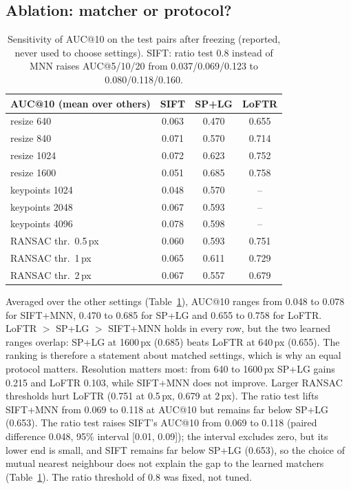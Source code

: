 \documentclass[10pt,twocolumn,letterpaper]{article}
\begin{document}
\subsection{Ablation: matcher or protocol?}
\begin{table}[t]\centering\small
\begin{tabular}{lccc}
\toprule
AUC@10 (mean over others) & SIFT & SP+LG & LoFTR\\
\midrule
resize 640 & 0.063 & 0.470 & 0.655\\
resize 840 & 0.071 & 0.570 & 0.714\\
resize 1024 & 0.072 & 0.623 & 0.752\\
resize 1600 & 0.051 & 0.685 & 0.758\\
keypoints 1024 & 0.048 & 0.570 & --\\
keypoints 2048 & 0.067 & 0.593 & --\\
keypoints 4096 & 0.078 & 0.598 & --\\
RANSAC thr.\ 0.5\,px & 0.060 & 0.593 & 0.751\\
RANSAC thr.\ 1\,px & 0.065 & 0.611 & 0.729\\
RANSAC thr.\ 2\,px & 0.067 & 0.557 & 0.679\\
\bottomrule
\end{tabular}
\caption{Sensitivity of AUC@10 on the test pairs after freezing (reported, never used to choose settings). SIFT: ratio test 0.8 instead of MNN raises AUC@5/10/20 from 0.037/0.069/0.123 to 0.080/0.118/0.160.}\label{tab:sens}
\end{table}
Averaged over the other settings (Table~\ref{tab:sens}), AUC@10 ranges from 0.048 to 0.078 for SIFT+MNN, 0.470 to 0.685 for SP+LG and 0.655 to 0.758 for LoFTR. LoFTR $>$ SP+LG $>$ SIFT+MNN holds in every row, but the two learned ranges overlap: SP+LG at 1600\,px (0.685) beats LoFTR at 640\,px (0.655). The ranking is therefore a statement about matched settings, which is why an equal protocol matters. Resolution matters most: from 640 to 1600\,px SP+LG gains 0.215 and LoFTR 0.103, while SIFT+MNN does not improve. Larger RANSAC thresholds hurt LoFTR (0.751 at 0.5\,px, 0.679 at 2\,px). The ratio test lifts SIFT+MNN from 0.069 to 0.118 at AUC@10 but remains far below SP+LG (0.653). The ratio test raises SIFT's AUC@10 from 0.069 to 0.118 (paired difference 0.048, 95\% interval [0.01, 0.09]); the interval excludes zero, but its lower end is small, and SIFT remains far below SP+LG (0.653), so the choice of mutual nearest neighbour does not explain the gap to the learned matchers (Table~\ref{tab:sens}). The ratio threshold of 0.8 was fixed, not tuned.
\end{document}
